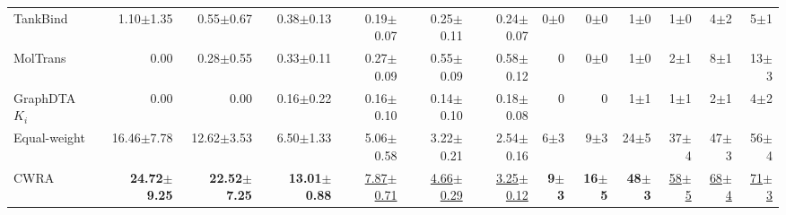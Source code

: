 \begin{table}[htbp!]
\begin{tabular}{lrrrrrr|rrrrrr}
TankBind & 1.10$\pm$1.35 & 0.55$\pm$0.67 & 0.38$\pm$0.13 & 0.19$\pm$0.07 & 0.25$\pm$0.11 & 0.24$\pm$0.07 & 0$\pm$0 & 0$\pm$0 & 1$\pm$0 & 1$\pm$0 & 4$\pm$2 & 5$\pm$1 \\
MolTrans & 0.00 & 0.28$\pm$0.55 & 0.33$\pm$0.11 & 0.27$\pm$0.09 & 0.55$\pm$0.09 & 0.58$\pm$0.12 & 0 & 0$\pm$0 & 1$\pm$0 & 2$\pm$1 & 8$\pm$1 & 13$\pm$3 \\
GraphDTA $K_{i}$ & 0.00 & 0.00 & 0.16$\pm$0.22 & 0.16$\pm$0.10 & 0.14$\pm$0.10 & 0.18$\pm$0.08 & 0 & 0 & 1$\pm$1 & 1$\pm$1 & 2$\pm$1 & 4$\pm$2 \\
\midrule
Equal-weight & 16.46$\pm$7.78 & 12.62$\pm$3.53 & 6.50$\pm$1.33 & 5.06$\pm$0.58 & 3.22$\pm$0.21 & 2.54$\pm$0.16 & 6$\pm$3 & 9$\pm$3 & 24$\pm$5 & 37$\pm$4 & 47$\pm$3 & 56$\pm$4 \\
CWRA & \textbf{24.72$\pm$9.25} & \textbf{22.52$\pm$7.25} & \textbf{13.01$\pm$0.88} & \underline{7.87$\pm$0.71} & \underline{4.66$\pm$0.29} & \underline{3.25$\pm$0.12} & \textbf{9$\pm$3} & \textbf{16$\pm$5} & \textbf{48$\pm$3} & \underline{58$\pm$5} & \underline{68$\pm$4} & \underline{71$\pm$3} \\
\bottomrule
\end{tabular}
\end{table}